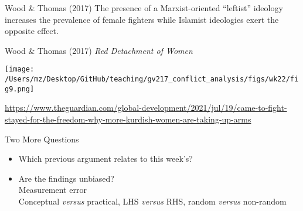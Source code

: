 \documentclass{beamer}
\begin{document}
\begin{frame}{Wood \& Thomas (2017)}
    \pause The presence of a Marxist-oriented ``leftist'' ideology increases the prevalence of female fighters while Islamist ideologies exert the opposite effect.
\end{frame}

\begin{frame}{Wood \& Thomas (2017)}
    \pause \textit{Red Detachment of Women}
    \begin{center}
        \texttt{[image: /Users/mz/Desktop/GitHub/teaching/gv217\_conflict\_analysis/figs/wk22/fig9.png]}
    \end{center}
    \tiny \url{https://www.theguardian.com/global-development/2021/jul/19/came-to-fight-stayed-for-the-freedom-why-more-kurdish-women-are-taking-up-arms}
\end{frame}

\begin{frame}{Two More Questions}
    \begin{itemize}
        \pause\item Which previous argument relates to this week's?
        \pause\item Are the findings unbiased?\\
        \pause      Measurement error\\
        \pause      Conceptual \textit{versus} practical, LHS \textit{versus} RHS, random \textit{versus} non-random
    \end{itemize}
\end{frame}
\end{document}
